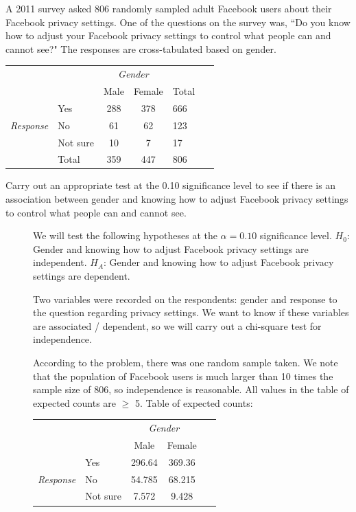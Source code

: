 \begin{examplewrap}
\begin{nexample}{A 2011 survey asked 806 randomly sampled adult Facebook users about their Facebook privacy settings. One of the questions on the survey was, ``Do you know how to adjust your Facebook privacy settings to control what people can and cannot see?" The responses are cross-tabulated based on gender. 
\label{facebookprivacy}
\begin{center}
\begin{tabular}{l l c c ll}
								&			& \multicolumn{2}{c}{\textit{Gender}}	& &\hspace{10mm}\ 		\\
\cline{3-4}
								&			& Male		& Female		& Total	\\
\cline{2-5}
								& Yes		& 288		& 378		& 666	\\
\textit{Response}					& No			& 61			& 62 			& 123	\\
								& Not sure	& 10			& 7 			& 17	\\
\cline{2-5}
								& Total		& 359		& 447		& 806
\end{tabular}
\end{center}
Carry out an appropriate test at the 0.10 significance level to see if there is an association between gender and knowing how to adjust Facebook privacy settings to control what people can and cannot see.}
\begin{description}
\item[] We will test the following hypotheses at the $\alpha=0.10$ significance level.  
\newline $H_0$: Gender and knowing how to adjust Facebook privacy settings are \mbox{independent.}
\newline $H_A$: Gender and knowing how to adjust Facebook privacy settings are \mbox{dependent.}
\item[] Two variables were recorded on the respondents: gender and response to the question regarding privacy settings.  We want to know if these variables are associated / dependent, so we will carry out a chi-square test for independence.  
\item[] According to the problem, there was one random sample taken.  We note that the population of Facebook users is much larger than 10 times the sample size of 806, so independence is reasonable.  All values in the table of expected counts are $\ge$ 5.
Table of expected counts:
\begin{center}
\begin{tabular}{l l c c l}
								&			& \multicolumn{2}{c}{\textit{Gender}}	&\hspace{17mm}\ 		\\
\cline{3-4}
								&			& Male		& Female	\\
\cline{2-4}
								& Yes		& 296.64		& 369.36	\\
\textit{Response}					& No			& 54.785		& 68.215	\\
								& Not sure	& 7.572		& 9.428	\\
\cline{2-4}
\end{tabular}
\end{center}


\end{description}
\end{nexample}
\end{examplewrap}
